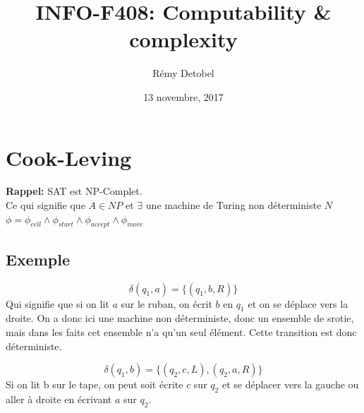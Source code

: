 \documentclass[a4paper,12pt]{article}
\title{INFO-F408: Computability \& complexity}
\date{13 novembre, 2017}
\author{Rémy Detobel}
\begin{document}
\maketitle
\newpage

\section{Cook-Leving}
  \textbf{Rappel:} SAT est NP-Complet.\\
  Ce qui signifie que $A \in NP$ et $\exists$ une machine de Turing non déterministe $N$\\
  $\phi = \phi_{cell} \wedge \phi_{start} \wedge \phi_{accept} \wedge \phi_{move}$

  \subsection{Exemple}
    $$\delta(q_1, a) = \{(q_1, b, R)\}$$
    Qui signifie que si on lit $a$ sur le ruban, on écrit $b$ en $q_1$ et on se déplace vers la droite. On a donc ici une machine non déterministe, donc un ensemble de srotie,
		mais dans les faits cet ensemble n'a qu'un seul élément. Cette transition est donc déterministe.

    $$\delta(q_1, b) = \{(q_2, c, L), (q_2, a, R)\}$$
    Si on lit b sur le tape, on peut soit écrite $c$ sur $q_2$ et se déplacer vers la gauche ou aller à droite en écrivant $a$ sur $q_2$.
\end{document}
